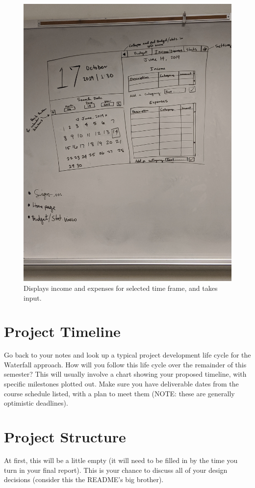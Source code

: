 \documentclass[10pt,conference,onecolumn,compsoc]{IEEEtran}
\begin{document}
\begin{figure}[h]
\begin{minipage}{.5\textwidth}
\includegraphics[scale = .05]{Income-Expenses.jpg}
\caption{Displays income and expenses for selected time frame, and takes input.}
\label{Income-ExpenseScreen}
\end{minipage}
\end{figure}


\section{Project Timeline}
Go back to your notes and look up a typical project development life cycle for the Waterfall approach.  How will you follow this life cycle over the remainder of this semester?  This will usually involve a chart showing your proposed timeline, with specific milestones plotted out.  Make sure you have deliverable dates from the course schedule listed, with a plan to meet them (NOTE: these are generally optimistic deadlines).

\section{Project Structure}
At first, this will be a little empty (it will need to be filled in by the time you turn in your final report).  This is your chance to discuss all of your design decisions (consider this the README's big brother).
\end{document}
